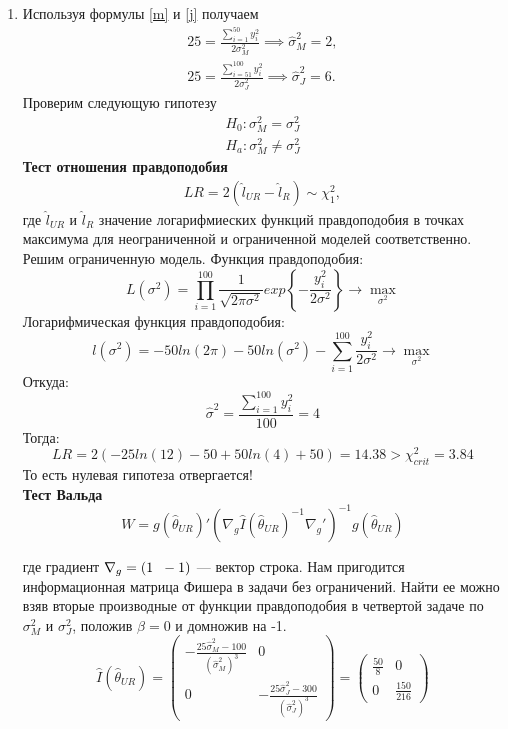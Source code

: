 \documentclass[12pt, a4paper]{article}\usepackage[]{graphicx}\usepackage[]{color}
\begin{document}
\begin{enumerate}
\item
Используя формулы \eqref{m} и \eqref{j} получаем
\begin{eqnarray}
25 = \frac{\sum_{i=1}^{50} y_i^2} {2\sigma^2_M} \implies \hat\sigma_M^2 = 2, \\
25 = \frac{\sum_{i=51}^{100} y_i^2} {2\sigma^2_J} \implies \hat\sigma_J^2 = 6.
\end{eqnarray}
Проверим следующую гипотезу
\begin{eqnarray}
H_0 : \sigma_M^2 = \sigma_J^2 \\
H_a : \sigma_M^2 \neq \sigma_J^2
\end{eqnarray}
\textbf{Тест отношения правдоподобия}
\begin{eqnarray}
LR = 2 (\hat{l}_{UR} - \hat{l}_R) \sim \chi^2_{1},
\end{eqnarray}
где $\hat{l}_{UR}$ и $\hat{l}_R$ значение логарифмиеских функций правдоподобия в точках максимума для неограниченной и ограниченной моделей соответственно. Решим ограниченную модель. Функция правдоподобия:
\[
L(\sigma^2) = \prod\limits_{i=1}^{100}\frac{1}{\sqrt{2\pi\sigma^2}}exp\left\{-\frac{y_i^2}{2\sigma^2}\right\}  \to \max\limits_{\sigma^2}
\]
Логарифмическая функция правдоподобия:
\[
l(\sigma^2) = -50ln(2\pi) - 50ln(\sigma^2) - \sum\limits_{i=1}^{100}\frac{y_i^2}{2\sigma^2} \to \max\limits_{\sigma^2}
\]
Откуда:
\[
\hat{\sigma}^2 = \frac{\sum_{i=1}^{100}y_i^2}{100} = 4
\]
Тогда:
\[
LR = 2(-25ln(12) - 50 + 50ln(4) + 50) = 14.38 > \chi^2_{crit} = 3.84
\]
То есть нулевая гипотеза отвергается! \\
\textbf{Тест Вальда}
\[
W = g(\hat{\theta}_{UR})'(\nabla_g \hat{I}(\hat{\theta}_{UR})^{-1} \nabla_g')^{-1}g(\hat{\theta}_{UR})
\]

где градиент $\nabla_g = (1 \hspace{2mm} -1)$ — вектор строка. Нам пригодится информационная матрица Фишера в задачи без ограничений. Найти ее можно взяв вторые производные от функции правдоподобия в четвертой задаче по $\sigma^2_M$ и $\sigma^2_J$, положив $\beta = 0$ и домножив на -1.
\[
\hat{I}(\hat{\theta}_{UR}) =
\begin{pmatrix}
-\frac{25\hat{\sigma}^2_M - 100}{\left(\hat{\sigma}^2_M\right)^3} & 0 \\
0 & -\frac{25\hat{\sigma}^2_J - 300}{\left(\hat{\sigma}^2_J\right)^3}
\end{pmatrix}
=
\begin{pmatrix}
\frac{50}{8} & 0 \\
0 & \frac{150}{216}


\end{pmatrix}\]
\end{enumerate}
\end{document}

